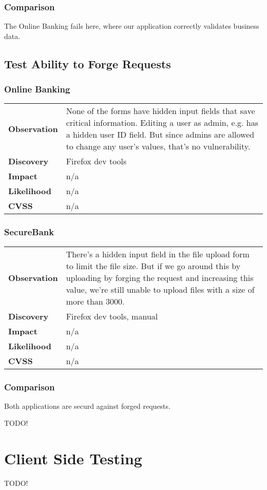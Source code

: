\subsubsection*{Comparison}
The Online Banking fails here, where our application correctly validates business data.

\clearpage


\subsection{Test Ability to Forge Requests}
\subsubsection*{Online Banking}
\begin{tabular}{l|p{10cm}}

\textbf{Observation} & None of the forms have hidden input fields that save critical information. Editing a user as admin, e.g. has a hidden user ID field. But since admins are allowed to change any user's values, that's no vulnerability. \\
\textbf{Discovery} & Firefox dev tools \\
\textbf{Impact} & n/a \\
\textbf{Likelihood} & n/a \\
\textbf{CVSS} & n/a \\
\end{tabular}

\subsubsection*{SecureBank}
\begin{tabular}{l|p{10cm}}

\textbf{Observation} & There's a hidden input field in the file upload form to limit the file size. But if we go around this by uploading by forging the request and increasing this value, we're still unable to upload files with a size of more than 3000. \\
\textbf{Discovery} & Firefox dev tools, manual \\
\textbf{Impact} & n/a \\
\textbf{Likelihood} & n/a \\
\textbf{CVSS} & n/a \\
\end{tabular}

\subsubsection*{Comparison}
Both applications are securd against forged requests.

\clearpage

TODO!











\section{Client Side Testing}
TODO!

